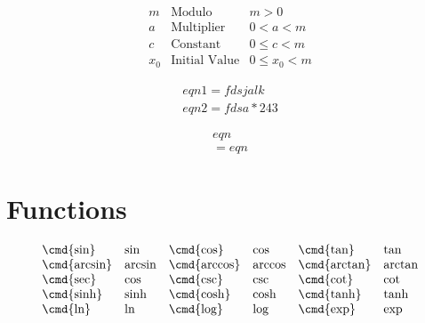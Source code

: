 		\begin{equation*}
			\begin{array}{lll}
				m   & \text{Modulo}        & m>0\\
				a   & \text{Multiplier}    & 0<a<m\\
				c   & \text{Constant}      & 0\leq c<m\\
				x_0 & \text{Initial Value} & 0\leq x_0 <m
			\end{array}
		\end{equation*}
		
		\begin{gather}
			eqn1 = fdsjalk \\
			eqn2 = fdsa * 243
		\end{gather}

		\begin{multline}
			eqn\\
			= eqn
		\end{multline}
	\section{Functions}
		
		\begin{equation*}
			\begin{array}{llllll}
				\text{\cmd{sin}} & \sin & \text{\cmd{cos}} & \cos & \text{\cmd{tan}} & \tan \\
				\text{\cmd{arcsin}} & \arcsin & \text{\cmd{arccos}} & \arccos & \text{\cmd{arctan}} & \arctan \\
				\text{\cmd{sec}} & \cos & \text{\cmd{csc}} & \csc & \text{\cmd{cot}} & \cot \\
				\text{\cmd{sinh}} & \sinh & \text{\cmd{cosh}} & \cosh & \text{\cmd{tanh}} & \tanh \\
				\text{\cmd{ln}} & \ln & \text{\cmd{log}} & \log & \text{\cmd{exp}} & \exp \\
			\end{array}
		\end{equation*}